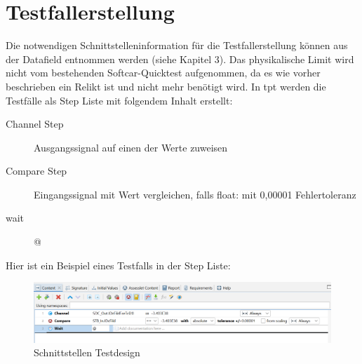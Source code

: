 \section*{Testfallerstellung}
Die notwendigen Schnittstelleninformation für die Testfallerstellung können aus der Datafield entnommen werden (siehe Kapitel 3).
Das physikalische Limit wird nicht vom bestehenden Softcar-Quicktest aufgenommen, da es wie vorher beschrieben ein Relikt ist und nicht mehr benötigt wird.
In \ac{tpt} werden die Testfälle als Step Liste mit folgendem Inhalt erstellt:
\begin{description}
\item[Channel Step] Ausgangssignal auf einen der Werte zuweisen
\item[Compare Step] Eingangssignal mit Wert vergleichen, falls float: mit 0,00001 Fehlertoleranz
\item[wait] @
\end{description}
Hier ist ein Beispiel eines Testfalls in der Step Liste:
\begin{figure}[h]
\centering
\includegraphics[scale=.6,]{Bilder/Quicktest/Testfallerstellung.png}
\caption{Schnittstellen Testdesign}
\end{figure}